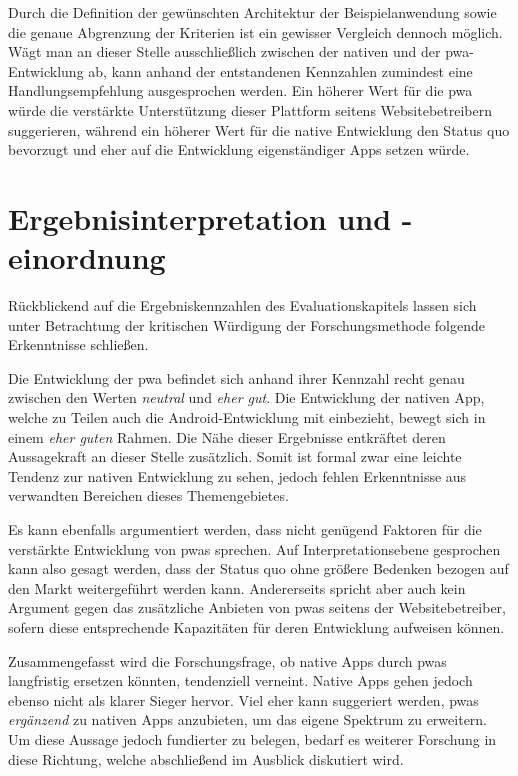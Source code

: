 Durch die Definition der gewünschten Architektur der Beispielanwendung sowie die genaue Abgrenzung der Kriterien ist ein gewisser Vergleich dennoch möglich. Wägt man an dieser Stelle ausschließlich zwischen der nativen und der \ac{pwa}-Entwicklung ab, kann anhand der entstandenen Kennzahlen zumindest eine Handlungsempfehlung ausgesprochen werden. Ein höherer Wert für die \ac{pwa} würde die verstärkte Unterstützung dieser Plattform seitens Websitebetreibern suggerieren, während ein höherer Wert für die native Entwicklung den Status quo bevorzugt und eher auf die Entwicklung eigenständiger Apps setzen würde.

\section{Ergebnisinterpretation und -einordnung}
Rückblickend auf die Ergebniskennzahlen des Evaluationskapitels lassen sich unter Betrachtung der kritischen Würdigung der Forschungsmethode folgende Erkenntnisse schließen.

Die Entwicklung der \ac{pwa} befindet sich anhand ihrer Kennzahl recht genau zwischen den Werten \textit{neutral} und \textit{eher gut}. Die Entwicklung der nativen App, welche zu Teilen auch die Android-Entwicklung mit einbezieht, bewegt sich in einem \textit{eher guten} Rahmen. Die Nähe dieser Ergebnisse entkräftet deren Aussagekraft an dieser Stelle zusätzlich. Somit ist formal zwar eine leichte Tendenz zur nativen Entwicklung zu sehen, jedoch fehlen Erkenntnisse aus verwandten Bereichen dieses Themengebietes.

Es kann ebenfalls argumentiert werden, dass nicht genügend Faktoren für die verstärkte Entwicklung von \acp{pwa} sprechen. Auf Interpretationsebene gesprochen kann also gesagt werden, dass der Status quo ohne größere Bedenken bezogen auf den Markt weitergeführt werden kann. Andererseits spricht aber auch kein Argument gegen das zusätzliche Anbieten von \acp{pwa} seitens der Websitebetreiber, sofern diese entsprechende Kapazitäten für deren Entwicklung aufweisen können.

Zusammengefasst wird die Forschungsfrage, ob native Apps durch \acp{pwa} langfristig ersetzen könnten, tendenziell verneint. Native Apps gehen jedoch ebenso nicht als klarer Sieger hervor. Viel eher kann suggeriert werden, \acp{pwa} \textit{ergänzend} zu nativen Apps anzubieten, um das eigene Spektrum zu erweitern. Um diese Aussage jedoch fundierter zu belegen, bedarf es weiterer Forschung in diese Richtung, welche abschließend im Ausblick diskutiert wird.

